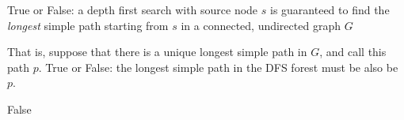 \begin{prob}

    True or False: a depth first search with source node $s$ is guaranteed to
    find the \emph{longest} simple path starting from $s$ in a connected,
    undirected graph $G$

    That is, suppose that there is a unique longest simple path in $G$, and call this path $p$.
    True or False: the longest simple path in the DFS forest must be also be $p$.

    \tF{}

    \begin{soln}
        False
    \end{soln}

\end{prob}
